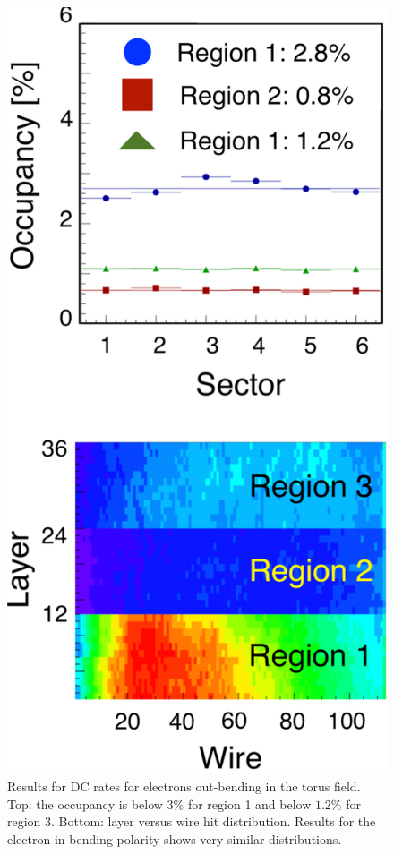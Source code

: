 \begin{figure}
	\centering
	\includegraphics[width=0.99\columnwidth,keepaspectratio]{img/dcOccupancy.png}
	\caption{Results for DC rates for electrons out-bending in the torus field.
		     Top: the occupancy is below $3\%$ for region 1 and below $1.2\%$ for region 3. Bottom: layer
		     versus wire hit distribution. Results for the electron in-bending polarity shows very similar distributions.}
	\label{fig:dcOccupancy}
\end{figure}

